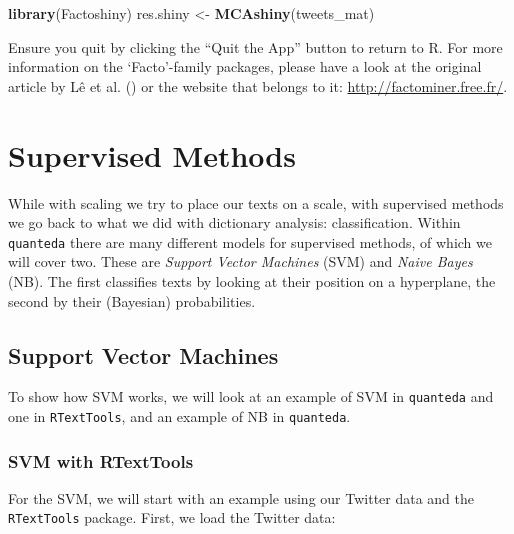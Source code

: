 \documentclass[
]{book}
\newenvironment{Shaded}{\begin{snugshade}}{\end{snugshade}}
\newcommand{\FunctionTok}[1]{\textcolor[rgb]{0.13,0.29,0.53}{\textbf{#1}}}
\newcommand{\NormalTok}[1]{#1}
\newcommand{\OtherTok}[1]{\textcolor[rgb]{0.56,0.35,0.01}{#1}}
\begin{document}
\begin{Shaded}
\begin{Highlighting}[]
\FunctionTok{library}\NormalTok{(Factoshiny)}
\NormalTok{res.shiny }\OtherTok{\textless{}{-}} \FunctionTok{MCAshiny}\NormalTok{(tweets\_mat)}
\end{Highlighting}
\end{Shaded}

Ensure you quit by clicking the ``Quit the App'' button to return to R. For more information on the `Facto'-family packages, please have a look at the original article by Lê et al. () or the website that belongs to it: \url{http://factominer.free.fr/}.

\chapter{Supervised Methods}\label{supervised-methods}

While with scaling we try to place our texts on a scale, with supervised methods we go back to what we did with dictionary analysis: classification. Within \texttt{quanteda} there are many different models for supervised methods, of which we will cover two. These are \emph{Support Vector Machines} (SVM) and \emph{Naive Bayes} (NB). The first classifies texts by looking at their position on a hyperplane, the second by their (Bayesian) probabilities.

\section{Support Vector Machines}\label{support-vector-machines}

To show how SVM works, we will look at an example of SVM in \texttt{quanteda} and one in \texttt{RTextTools}, and an example of NB in \texttt{quanteda}.

\subsection{SVM with RTextTools}\label{svm-with-rtexttools}

For the SVM, we will start with an example using our Twitter data and the \texttt{RTextTools} package. First, we load the Twitter data:
\end{document}
